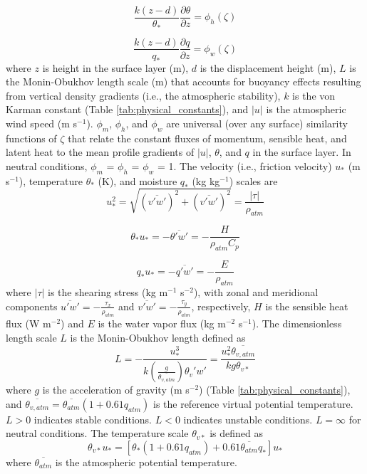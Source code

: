 \documentclass[12pt,authoryear]{elsarticle}
\numberwithin{equation}{section} %
\begin{document}
\begin{equation}
\frac{k(z-d)}{\theta_*}\frac{\partial \theta}{\partial z} = \phi_{h}(\zeta)
\end{equation}

\begin{equation}
\frac{k(z-d)}{q_*}\frac{\partial q}{\partial z}=\phi_{w}(\zeta)
\end{equation}
where $z$ is height in the surface layer (m), $d$ is the displacement height (m), $L$ is the Monin-Obukhov length scale (m) that accounts for buoyancy effects resulting from vertical density gradients (i.e., the atmospheric stability), $k$ is the von Karman constant
(Table \ref{tab:physical_constants}), and $|u|$ is the atmospheric wind speed (m s$^{-1}$). $\phi_{m}$, $\phi_{h}$, and $\phi_{w}$ are universal (over any surface) similarity functions of $\zeta$ that relate the constant fluxes of momentum, sensible heat, and latent heat to the mean profile gradients of $|u|$, $\theta$, and $q$ in the surface layer. In neutral conditions, $\phi_{m}$ = $\phi_{h}$ = $\phi_{w}$ = 1. The velocity (i.e., friction velocity) $u_*$ (m s$^{-1}$), temperature $\theta_*$ (K), and moisture $q_*$ (kg kg$^{-1}$) scales are 
\begin{equation}
u_*^2=\sqrt{(\overline{v'w'})^2+(\overline{v'w'})^2}=\frac{|\tau|}{\rho_{atm}}
\end{equation}

\begin{equation}
\theta_*u_*=-\overline{\theta'w'}=-\frac{H}{\rho_{atm}C_{p}}
\end{equation}

\begin{equation}
q_*u_*=-\overline{q'w'}=-\frac{E}{\rho_{atm}}
\end{equation}
where $|\tau|$ is the shearing stress (kg m$^{-1}$ s$^{-2}$), with zonal and meridional components $\overline{u'w'}=-\frac{\tau_{x}}{\rho_{atm}}$ and $\overline{v'w'}=-\frac{\tau_{y}}{\rho_{atm}}$, respectively, $H$ is the sensible heat flux (W m$^{-2}$) and $E$ is the water vapor flux (kg m$^{-2}$ s$^{-1}$). 
The dimensionless length scale $L$ is the Monin-Obukhov length defined as 
\begin{equation}
L=-\frac{u_*^3}{k\left(\frac{g}{\overline{\theta_{v,atm}}}\right)\theta_{v}'w'}=\frac{u_*^2\overline{\theta_{v,atm}}}{kg\theta_{v*}}
\end{equation}
where $g$ is the acceleration of gravity (m s$^{-2}$) (Table \ref{tab:physical_constants}), and $\overline{\theta_{v,atm}}=\overline{\theta_{atm}}(1+0.61q_{atm})$ is the reference virtual potential temperature. $L>0$ indicates stable conditions. $L<$0 indicates unstable conditions. $L=\infty$ for neutral conditions. The temperature scale $\theta_{v*}$ is defined as 
\begin{equation}
\label{eq:temperature_scale}
\theta_{v*}u_{*}=\left[\theta_*(1+0.61q_{atm})+0.61\overline{\theta_{atm}}q_*\right]u_*
\end{equation}
where $\overline{\theta_{atm}}$ is the atmospheric potential temperature.
\end{document}
